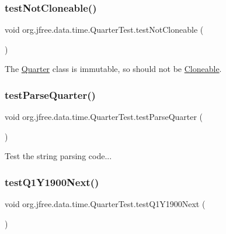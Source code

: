 \subsubsection{\texorpdfstring{test\+Not\+Cloneable()}{testNotCloneable()}}
{\footnotesize\ttfamily void org.\+jfree.\+data.\+time.\+Quarter\+Test.\+test\+Not\+Cloneable (\begin{DoxyParamCaption}{ }\end{DoxyParamCaption})}

The \mbox{\hyperlink{classorg_1_1jfree_1_1data_1_1time_1_1_quarter}{Quarter}} class is immutable, so should not be \mbox{\hyperlink{}{Cloneable}}. \mbox{\label{classorg_1_1jfree_1_1data_1_1time_1_1_quarter_test_a876c013f7c505f5e6803b7c31e5698ca}} 
\subsubsection{\texorpdfstring{test\+Parse\+Quarter()}{testParseQuarter()}}
{\footnotesize\ttfamily void org.\+jfree.\+data.\+time.\+Quarter\+Test.\+test\+Parse\+Quarter (\begin{DoxyParamCaption}{ }\end{DoxyParamCaption})}

Test the string parsing code... \mbox{\label{classorg_1_1jfree_1_1data_1_1time_1_1_quarter_test_a900ec0d8f2135d97009522f1d0c98e56}} 
\subsubsection{\texorpdfstring{test\+Q1\+Y1900\+Next()}{testQ1Y1900Next()}}
{\footnotesize\ttfamily void org.\+jfree.\+data.\+time.\+Quarter\+Test.\+test\+Q1\+Y1900\+Next (\begin{DoxyParamCaption}{ }\end{DoxyParamCaption})}

